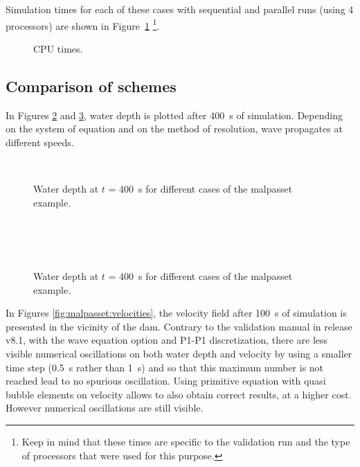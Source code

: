 Simulation times for each of these cases with sequential and parallel runs
(using 4 processors) are shown in Figure~\ref{fig:malpasset:cputime}
\footnote{Keep in mind that these times
are specific to the validation run and the type of processors that were used for this purpose.}.

\begin{figure}[h!]
  \centering
  \caption{CPU times.}
  \label{fig:malpasset:cputime}
\end{figure}

\subsection{Comparison of schemes}

In Figures \ref{fig:malpasset:WD_all1} and \ref{fig:malpasset:WD_all2},
water depth is plotted after 400~s of simulation.
Depending on the system of equation and on the method of resolution, wave
propagates at different speeds.

\begin{figure}[H]
  \centering
  \\
  \caption{Water depth at $t$ = 400~s for different cases of the malpasset example.}
  \label{fig:malpasset:WD_all1}
\end{figure}

\begin{figure}[H]
  \centering
  \\
  \\
  \\
  \caption{Water depth at $t$ = 400~s for different cases of the malpasset example.}
  \label{fig:malpasset:WD_all2}
\end{figure}

In Figures \ref{fig:malpasset:velocities}, the velocity field after 100~s of
simulation is presented in the vicinity of the dam.
Contrary to the  validation manual in release v8.1,
with the wave equation option and P1-P1 discretization, there are less visible
numerical oscillations on both water depth and velocity by
using a smaller time step (0.5~s rather than 1~s) and
 so that this maximum
number is not reached lead to no spurious oscillation.
Using primitive equation with quasi bubble elements on velocity allows to also
obtain correct results, at a higher cost.
However numerical oscillations are still visible.

